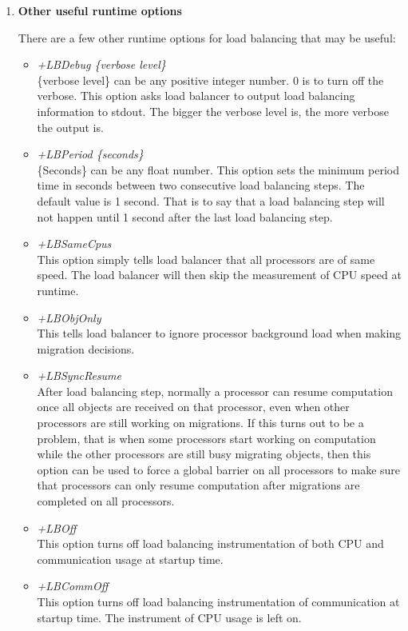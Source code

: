 \begin{enumerate}
\item {\bf Other useful runtime options}

There are a few other runtime options for load balancing that may be useful:

\begin{itemize}
\item {\em +LBDebug \{verbose level\}} \\
     \{verbose level\} can be any positive integer number. 0 is to turn off the verbose. 
     This option asks load balancer to output load balancing information to stdout.
     The bigger the verbose level is, the more verbose the output is.
\item {\em +LBPeriod \{seconds\}} \\
     \{Seconds\} can be any float number. This option sets the minimum period time in 
seconds between two consecutive load balancing steps. The default value is 
1 second. That is to say that a load balancing step will not happen until
1 second after the last load balancing step.
\item {\em +LBSameCpus} \\
     This option simply tells load balancer that all processors are of same speed.
     The load balancer will then skip the measurement of CPU speed at runtime.
\item {\em +LBObjOnly} \\
     This tells load balancer to ignore processor background load when making migration decisions.
\item {\em +LBSyncResume} \\
     After load balancing step, normally a processor can resume computation 
once all objects are received on that processor, even when other processors
are still working on migrations.  If this turns out to be a problem, 
that is when some processors start working on computation while the other 
processors are still busy migrating objects, then this option can be used to force 
a global barrier on all processors to make sure that processors can only resume 
computation after migrations are completed on all processors.
\item {\em +LBOff} \\
     This option turns off load balancing instrumentation 
     of both CPU and communication usage at startup time. 
\item {\em +LBCommOff} \\
     This option turns off load balancing instrumentation of communication at startup time. 
     The instrument of CPU usage is left on.
\end{itemize}

\end{enumerate}

